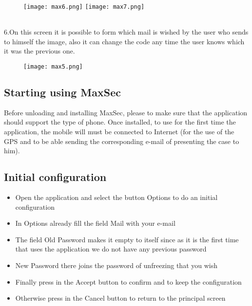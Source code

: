 \documentclass[12pt,letterpaper]{article}
\begin{document}
\begin{figure}[h]
\begin{center}
\texttt{[image: max6.png]}\hspace{2cm}
\texttt{[image: max7.png]}\\
\end{center}
\end{figure}\\
6.On this screen it is possible to form which mail is wished by the user who sends to himself the image, also it can change the code any time the user knows which it was the previous one.
\begin{figure}[h]
\begin{center}
\texttt{[image: max5.png]}\\
\end{center}
\end{figure}

\newpage
\subsection{Starting using MaxSec}
\begin{raggedleft}
Before unloading and installing MaxSec, please to make sure that the application should support the type of phone.
Once installed, to use for the first time the application, the mobile will must be connected to Internet (for the use of the GPS and to be able sending the corresponding e-mail of presenting the case to him).
\end{raggedleft}
\subsection{Initial configuration}

 \begin{itemize}

\item{Open the application and select the button Options to do an initial configuration}

\item{In Options already fill the field Mail with your e-mail}

\item{The field Old Password makes it empty to itself since as it is the first time that uses the application we do not have any previous password}

\item{New Password there joins the password of unfreezing that you wish}

\item{Finally press in the Accept button to confirm and to keep the configuration}

\item{Otherwise press in the Cancel button to return to the principal screen}

\end{itemize}
\end{document}
